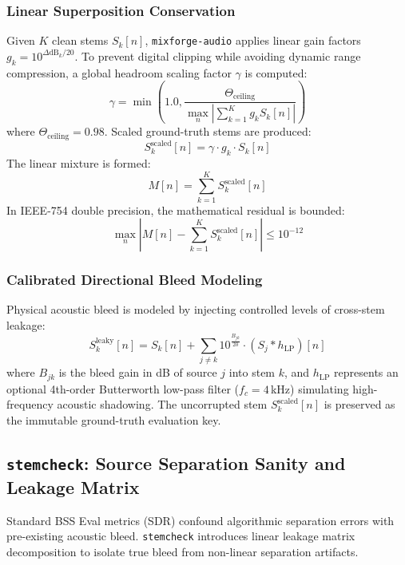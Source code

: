 \documentclass[10pt,journal,compsoc]{IEEEtran}
\begin{document}
\subsubsection{Linear Superposition Conservation}
Given $K$ clean stems $S_k[n]$, \texttt{mixforge-audio} applies linear gain factors $g_k = 10^{\Delta \text{dB}_k / 20}$. To prevent digital clipping while avoiding dynamic range compression, a global headroom scaling factor $\gamma$ is computed:
\begin{equation}
\gamma = \min\left(1.0, \frac{\Theta_{\text{ceiling}}}{\max_n |\sum_{k=1}^K g_k S_k[n]|}\right)
\label{eq:mixforge_gamma}
\end{equation}
where $\Theta_{\text{ceiling}} = 0.98$. Scaled ground-truth stems are produced:
\begin{equation}
S_k^{\text{scaled}}[n] = \gamma \cdot g_k \cdot S_k[n]
\label{eq:scaled_stems}
\end{equation}
The linear mixture is formed:
\begin{equation}
M[n] = \sum_{k=1}^K S_k^{\text{scaled}}[n]
\label{eq:exact_sum}
\end{equation}
In IEEE-754 double precision, the mathematical residual is bounded:
\begin{equation}
\max_n \left| M[n] - \sum_{k=1}^K S_k^{\text{scaled}}[n] \right| \le 10^{-12}
\label{eq:float_bound}
\end{equation}

\subsubsection{Calibrated Directional Bleed Modeling}
Physical acoustic bleed is modeled by injecting controlled levels of cross-stem leakage:
\begin{equation}
S_k^{\text{leaky}}[n] = S_k[n] + \sum_{j \ne k} 10^{\frac{B_{jk}}{20}} \cdot (S_j * h_{\text{LP}})[n]
\label{eq:bleed_model}
\end{equation}
where $B_{jk}$ is the bleed gain in dB of source $j$ into stem $k$, and $h_{\text{LP}}$ represents an optional 4th-order Butterworth low-pass filter ($f_c = 4$\,kHz) simulating high-frequency acoustic shadowing. The uncorrupted stem $S_k^{\text{scaled}}[n]$ is preserved as the immutable ground-truth evaluation key.

\subsection{\texttt{stemcheck}: Source Separation Sanity and Leakage Matrix}
Standard BSS Eval metrics (SDR) confound algorithmic separation errors with pre-existing acoustic bleed. \texttt{stemcheck} introduces linear leakage matrix decomposition to isolate true bleed from non-linear separation artifacts.
\end{document}
